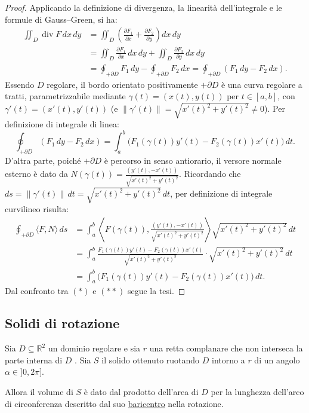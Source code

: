 \begin{proof}
Applicando la definizione di divergenza, la linearità dell'integrale e le formule di Gauss--Green, si ha:
\begin{align*}
\iint_D \operatorname{div} F \, dx \, dy 
&= \iint_D \left( \frac{\partial F_1}{\partial x} + \frac{\partial F_2}{\partial y} \right) dx \, dy \\
&= \iint_D \frac{\partial F_1}{\partial x} \, dx \, dy + \iint_D \frac{\partial F_2}{\partial y} \, dx \, dy \\
&= \oint_{+\partial D} F_1 \, dy - \oint_{+\partial D} F_2 \, dx 
= \oint_{+\partial D} (F_1 \, dy - F_2 \, dx).
\end{align*}
Essendo $D$ regolare, il bordo orientato positivamente $+\partial D$ è una curva regolare a tratti, parametrizzabile mediante $\gamma(t) = (x(t), y(t))$ per $t \in [a,b]$, con $\gamma'(t) = (x'(t), y'(t))$ (e $\|\gamma'(t)\| = \sqrt{x'(t)^2 + y'(t)^2} \neq 0$).
Per definizione di integrale di linea:
\begin{equation*}
\oint_{+\partial D} (F_1 \, dy - F_2 \, dx) = \int_a^b \big( F_1(\gamma(t)) y'(t) - F_2(\gamma(t)) x'(t) \big) \, dt. \tag{$*$}
\end{equation*}
D'altra parte, poiché $+\partial D$ è percorso in senso antiorario, il versore normale esterno è dato da $N(\gamma(t)) = \frac{(y'(t), -x'(t))}{\sqrt{x'(t)^2 + y'(t)^2}}$. Ricordando che $ds = \|\gamma'(t)\| \, dt = \sqrt{x'(t)^2 + y'(t)^2} \, dt$, per definizione di integrale curvilineo risulta:
\begin{align*}
\oint_{+\partial D} \langle F, N \rangle \, ds 
&= \int_a^b \left\langle F(\gamma(t)), \frac{(y'(t), -x'(t))}{\sqrt{x'(t)^2 + y'(t)^2}} \right\rangle \sqrt{x'(t)^2 + y'(t)^2} \, dt \\
&= \int_a^b \frac{F_1(\gamma(t)) y'(t) - F_2(\gamma(t)) x'(t)}{\sqrt{x'(t)^2 + y'(t)^2}} \cdot \sqrt{x'(t)^2 + y'(t)^2} \, dt \\
&= \int_a^b \big( F_1(\gamma(t)) y'(t) - F_2(\gamma(t)) x'(t) \big) \, dt. \tag{$**$}
\end{align*}
Dal confronto tra $(*)$ e $(**)$ segue la tesi.
\end{proof}

\subsection{Solidi di rotazione}

\begin{theorem}
Sia $D \subseteq \mathbb{R}^2$ un dominio regolare e sia $r$ una retta complanare che non interseca la parte interna di $D$ . Sia $S$ il solido ottenuto ruotando $D$ intorno a $r$ di un angolo $\alpha \in ]0, 2\pi]$.

Allora il volume di $S$ è dato dal prodotto dell'area di $D$ per la lunghezza dell'arco di circonferenza descritto dal suo \underline{baricentro} nella rotazione.
\end{theorem}

